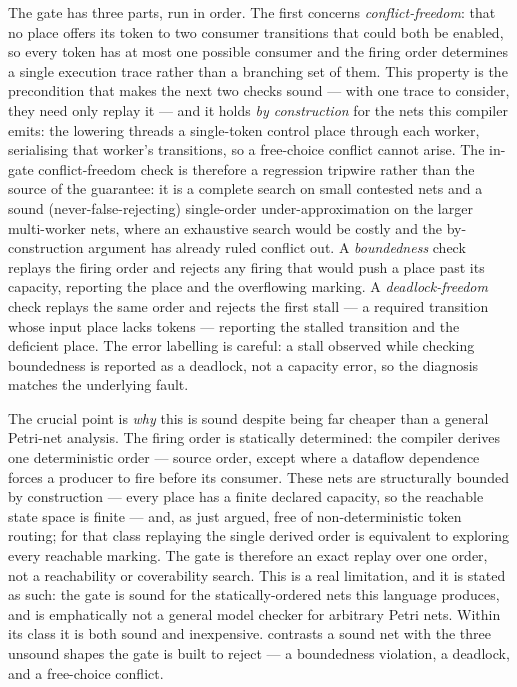 The gate has three parts, run in order. The first concerns \emph{conflict-freedom}:
that no place offers its token to two consumer transitions that could both be
enabled, so every token has at most one possible consumer and the firing order
determines a single execution trace rather than a branching set of them. This
property is the precondition that makes the next two checks sound --- with one
trace to consider, they need only replay it --- and it holds \emph{by construction}
for the nets this compiler emits: the lowering threads a single-token control place
through each worker, serialising that worker's transitions, so a free-choice
conflict cannot arise. The in-gate conflict-freedom check is therefore a regression
tripwire rather than the source of the guarantee: it is a complete search on small
contested nets and a sound (never-false-rejecting) single-order under-approximation
on the larger multi-worker nets, where an exhaustive search would be costly and the
by-construction argument has already ruled conflict out. A \emph{boundedness} check
replays the firing order and rejects any firing that would push a place past its
capacity, reporting the place and the overflowing marking. A
\emph{deadlock-freedom} check replays the same order and rejects the first stall
--- a required transition whose input place lacks tokens --- reporting the stalled
transition and the deficient place. The error labelling is careful: a stall
observed while checking boundedness is reported as a deadlock, not a capacity
error, so the diagnosis matches the underlying fault.

The crucial point is \emph{why} this is sound despite being far cheaper than a
general Petri-net analysis. The firing order is statically determined: the
compiler derives one deterministic order --- source order, except where a dataflow
dependence forces a producer to fire before its consumer. These nets are
structurally bounded by construction --- every place has a finite declared
capacity, so the reachable state space is finite --- and, as just argued, free of
non-deterministic token routing; for that class replaying the single derived order
is equivalent to exploring every reachable marking. The gate is therefore an exact
replay over one order, not a reachability or coverability search. This is a real limitation, and
it is stated as such: the gate is sound for the statically-ordered nets this
language produces, and is emphatically not a general model checker for arbitrary
Petri nets. Within its class it is both sound and inexpensive.
 contrasts a sound net with the three unsound shapes the gate
is built to reject --- a boundedness violation, a deadlock, and a free-choice
conflict.

